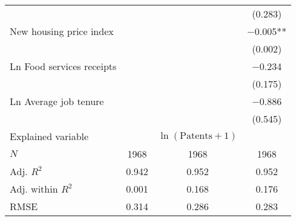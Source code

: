\begin{tabular}[t]{lccc}
 &  &  & (\num{0.283})\\
New housing price index &  &  & \num{-0.005}**\\
 &  &  & (\num{0.002})\\
Ln Food services receipts &  &  & \num{-0.234}\\
 &  &  & (\num{0.175})\\
Ln Average job tenure &  &  & \num{-0.886}\\
 &  &  & (\num{0.545})\\
\midrule
Explained variable &  & $\ln(\text{Patents}+1)$ & \\
$N$ & \num{1968} & \num{1968} & \num{1968}\\
Adj. $R^2$ & \num{0.942} & \num{0.952} & \num{0.952}\\
Adj. within $R^2$ & \num{0.001} & \num{0.168} & \num{0.176}\\
RMSE & \num{0.314} & \num{0.286} & \num{0.283}\\
\bottomrule
\end{tabular}

